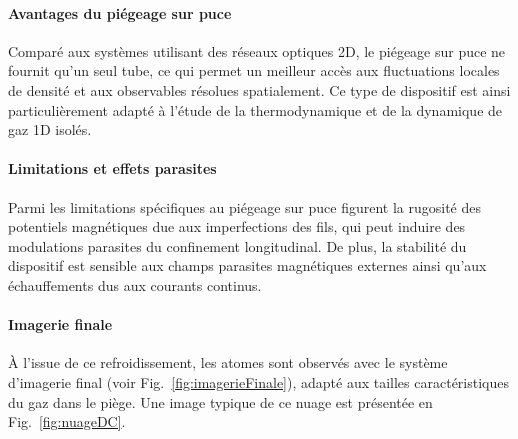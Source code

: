 \paragraph{Avantages du piégeage sur puce}
Comparé aux systèmes utilisant des réseaux optiques 2D, le piégeage sur puce ne fournit qu’un seul tube, ce qui permet un meilleur accès aux fluctuations locales de densité et aux observables résolues spatialement. Ce type de dispositif est ainsi particulièrement adapté à l'étude de la thermodynamique et de la dynamique de gaz 1D isolés.

\paragraph{Limitations et effets parasites}
Parmi les limitations spécifiques au piégeage sur puce figurent la rugosité des potentiels magnétiques due aux imperfections des fils, qui peut induire des modulations parasites du confinement longitudinal. De plus, la stabilité du dispositif est sensible aux champs parasites magnétiques externes ainsi qu’aux échauffements dus aux courants continus.





\paragraph{Imagerie finale}
À l’issue de ce refroidissement, les atomes sont observés avec le système d’imagerie final (voir Fig.~\ref{fig:imagerieFinale}), adapté aux tailles caractéristiques du gaz dans le piège. Une image typique de ce nuage est présentée en Fig.~\ref{fig:nuageDC}.



%


